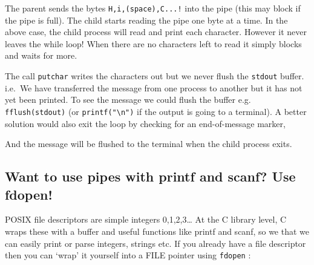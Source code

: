 The parent sends the bytes \texttt{H,i,(space),C...!} into the pipe
(this may block if the pipe is full). The child starts reading the pipe
one byte at a time. In the above case, the child process will read and
print each character. However it never leaves the while loop! When there
are no characters left to read it simply blocks and waits for more.

The call \texttt{putchar} writes the characters out but we never flush
the \texttt{stdout} buffer. i.e.~We have transferred the message from
one process to another but it has not yet been printed. To see the
message we could flush the buffer e.g. \texttt{fflush(stdout)} (or
\texttt{printf("\textbackslash{}n")} if the output is going to a
terminal). A better solution would also exit the loop by checking for an
end-of-message marker,

\begin{Shaded}
\begin{Highlighting}[]
         \NormalTok{((bytesread = read(fd[}\NormalTok{], &buf, }\NormalTok{)) > }\NormalTok{) \{}
             \NormalTok{; }
        \NormalTok{\}}
\end{Highlighting}
\end{Shaded}

And the message will be flushed to the terminal when the child process
exits.

\subsection{Want to use pipes with printf and scanf? Use
fdopen!}\label{want-to-use-pipes-with-printf-and-scanf-use-fdopen}

POSIX file descriptors are simple integers 0,1,2,3\ldots{} At the C
library level, C wraps these with a buffer and useful functions like
printf and scanf, so we that we can easily print or parse integers,
strings etc. If you already have a file descriptor then you can `wrap'
it yourself into a FILE pointer using \texttt{fdopen} :

\begin{Shaded}
\end{Shaded}

